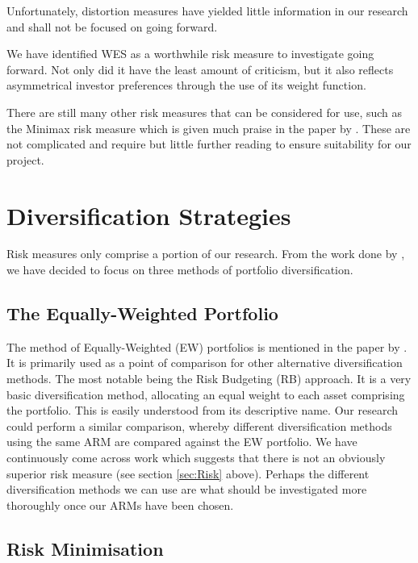 \documentclass[12pt,a4paper]{article}
\begin{document}
Unfortunately, distortion measures have yielded little information in our research and shall not be focused on going forward.

We have identified WES as a worthwhile risk measure to investigate going forward. Not only did it have the least amount of criticism, but it also reflects asymmetrical investor preferences through the use of its weight function.

There are still many other risk measures that can be considered for use, such as the Minimax risk measure which is given much praise in the paper by \cite{hoe2010empirical}. These are not complicated and require but little further reading to ensure suitability for our project.

\section{Diversification Strategies}
\label{sec:Div}

Risk measures only comprise a portion of our research. From the work done by \cite{bruder2012managing}, we have decided to focus on three methods of portfolio diversification.

\subsection{The Equally-Weighted Portfolio}
\label{subsec:EW} 

The method of Equally-Weighted (EW) portfolios is mentioned in the paper by \cite{bruder2012managing}. It is primarily used as a point of comparison for other alternative diversification methods. The most notable being the Risk Budgeting (RB) approach. It is a very basic diversification method, allocating an equal weight to each asset comprising the portfolio. This is easily understood from its descriptive name. Our research could perform a similar comparison, whereby different diversification methods using the same ARM are compared against the EW portfolio. We have continuously come across work which suggests that there is not an obviously superior risk measure (see section \ref{sec:Risk} above). Perhaps the different diversification methods we can use are what should be investigated more thoroughly once our ARMs have been chosen.

\subsection{Risk Minimisation}
\label{subsec:Riskmin} 
\end{document}
